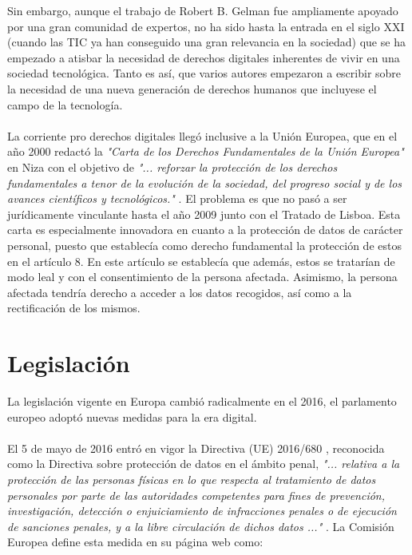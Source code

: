 \begin{refsection}
Sin embargo, aunque el trabajo de Robert B. Gelman fue ampliamente apoyado por una gran comunidad de expertos, no ha sido hasta la entrada en el siglo XXI (cuando las TIC ya han conseguido una gran relevancia en la sociedad) que se ha empezado a atisbar la necesidad de derechos digitales inherentes de vivir en una sociedad tecnológica. Tanto es así, que varios autores empezaron a escribir sobre la necesidad de una nueva generación de derechos humanos que incluyese el campo de la tecnología.
\\ \\
La corriente pro derechos digitales llegó inclusive a la Unión Europea, que en el año 2000 redactó la \textit{"Carta de los Derechos Fundamentales de la Unión Europea"} \autocite{CartaDerechosFundamentalesb} en Niza con el objetivo de \textit{"... reforzar la protección de los derechos fundamentales a tenor de la evolución de la sociedad, del progreso social y de los avances científicos y tecnológicos."} \autocite[]{CartaDerechosFundamentalesb}. El problema es que no pasó a ser jurídicamente vinculante hasta el año 2009 junto con el Tratado de Lisboa. Esta carta es especialmente innovadora en cuanto a la protección de datos de carácter personal, puesto que establecía como derecho fundamental la protección de estos en el artículo 8. En este artículo se establecía que además, estos se tratarían de modo leal y con el consentimiento de la persona afectada. Asimismo, la persona afectada tendría derecho a acceder a los datos recogidos, así como a la rectificación de los mismos.

\section{Legislación}\label{appendix:ProteccionDatos_Legislacion}
La legislación vigente en Europa cambió radicalmente en el 2016, el parlamento europeo adoptó nuevas medidas para la era digital.
\\ \\
El 5 de mayo de 2016 entró en vigor la Directiva (UE) 2016/680 \autocite{DIRECTIVAUE2016}, reconocida como la Directiva sobre protección de datos en el ámbito penal, \textit{"... relativa a la protección de las personas físicas en lo que respecta al tratamiento de datos personales por parte de las autoridades competentes para fines de prevención, investigación, detección o enjuiciamiento de infracciones penales o de ejecución de sanciones penales, y a la libre circulación de dichos datos ..."} \autocite[]{DIRECTIVAUE2016}. La Comisión Europea define esta medida en su página web \autocite{ProteccionDatosUEa} como:


\end{refsection}
